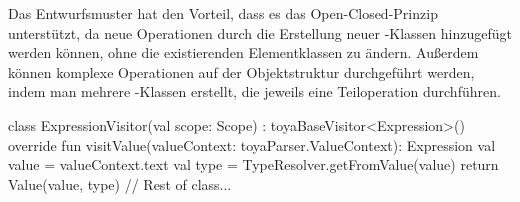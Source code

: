 Das \visitor Entwurfsmuster hat den Vorteil, dass es das Open-Closed-Prinzip unterstützt, da neue Operationen durch die Erstellung neuer \visitor-Klassen hinzugefügt werden können, ohne die existierenden Elementklassen zu ändern. Außerdem können komplexe Operationen auf der Objektstruktur durchgeführt werden, indem man mehrere \visitor-Klassen erstellt, die jeweils eine Teiloperation durchführen.

\begin{ToyaCode}
class ExpressionVisitor(val scope: Scope) : toyaBaseVisitor<Expression>() {
    override fun visitValue(valueContext: toyaParser.ValueContext): Expression {
        val value = valueContext.text
        val type = TypeResolver.getFromValue(value)
        return Value(value, type)
    }
    // Rest of class...
}
\end{ToyaCode}